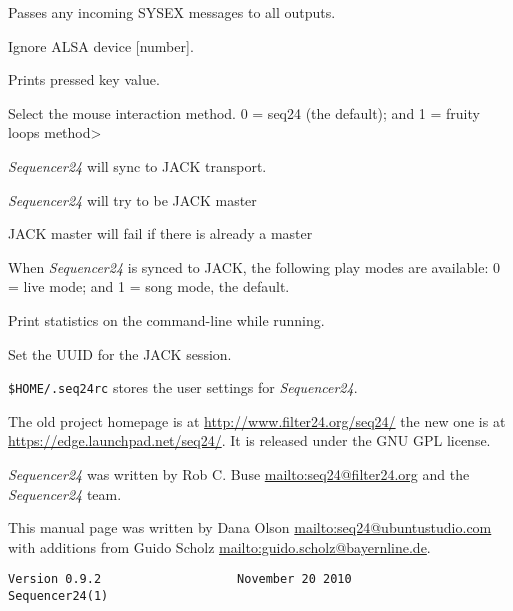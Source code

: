       Passes any incoming SYSEX messages to all outputs.

      Ignore ALSA device [number].

      Prints pressed key value.

      Select the mouse interaction method.
      0 = seq24 (the default); and 1 = fruity loops method>

      \textsl{Sequencer24} will sync to JACK transport.

      \textsl{Sequencer24} will try to be JACK master

      JACK master will fail if there is already a master

      When \textsl{Sequencer24} is synced to JACK, the following play modes are
      available: 0 = live mode; and 1 = song mode, the default.

      Print statistics on the command-line while running.

      Set the UUID for the JACK session.

   \texttt{\$HOME/.seq24rc} stores the user settings for \textsl{Sequencer24}.

   The old project homepage is at
   \url{http://www.filter24.org/seq24/} the new
   one is at \url{https://edge.launchpad.net/seq24/}.
   It is released under the GNU GPL license.

   \textsl{Sequencer24} was written by Rob C. Buse \url{mailto:seq24@filter24.org}
   and the \textsl{Sequencer24} team.

   This manual page was written by Dana Olson
   \url{mailto:seq24@ubuntustudio.com} with additions from Guido Scholz
   \url{mailto:guido.scholz@bayernline.de}.

   \begin{verbatim}
Version 0.9.2                   November 20 2010                       Sequencer24(1)
   \end{verbatim}

